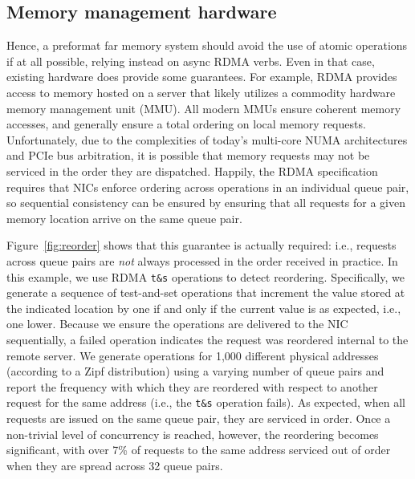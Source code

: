 \subsection{Memory management hardware}

Hence, a preformat far memory system should avoid the use of atomic operations
if at all possible, relying instead on async RDMA verbs.  Even in that case,
existing hardware does provide some guarantees.  For example, RDMA provides
access to memory hosted on a server that likely utilizes a commodity hardware
memory management unit (MMU).  All modern MMUs ensure coherent memory accesses,
and generally ensure a total ordering on local memory requests.  Unfortunately,
due to the complexities of today's multi-core NUMA architectures and PCIe bus
arbitration, it is possible that memory requests may not be serviced in the
order they are dispatched. Happily, the RDMA specification requires that NICs
enforce ordering across operations in an individual queue pair, so sequential
consistency can be ensured by ensuring that all requests for a given memory
location arrive on the same queue pair.


Figure~\ref{fig:reorder} shows that this guarantee is actually required: i.e.,
requests across queue pairs are \emph{not} always processed in the order
received in practice.  In this example, we use RDMA \texttt{t\&s} operations to
detect reordering.  Specifically, we generate a sequence of test-and-set
operations that increment the value stored at the indicated location by one if
and only if the current value is as expected, i.e., one lower.  Because we
ensure the operations are delivered to the NIC sequentially, a failed operation
indicates the request was reordered internal to the remote server.  We generate
operations for 1,000 different physical addresses (according to a Zipf
distribution) using a varying number of queue pairs and report the frequency
with which they are reordered with respect to another request for the same
address (i.e., the \texttt{t\&s} operation fails).  As expected, when all
requests are issued on the same queue pair, they are serviced in order.  Once a
non-trivial level of concurrency is reached, however, the reordering becomes
significant, with over 7\% of requests to the same address serviced out of order
when they are spread across 32 queue pairs.

